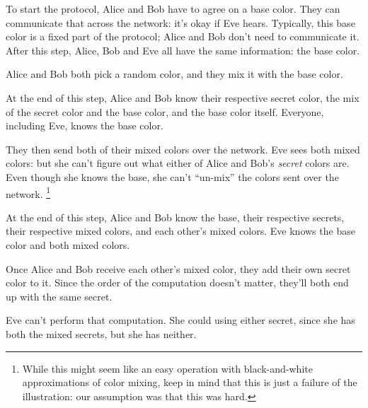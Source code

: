 \documentclass[11pt,ebook,table,dvipsnames]{memoir}
\begin{document}
To start the protocol, Alice and Bob have to agree on a base color.
They can communicate that across the network: it's okay if Eve hears.
Typically, this base color is a fixed part of the protocol; Alice and
Bob don't need to communicate it. After this step, Alice, Bob and Eve
all have the same information: the base color.


Alice and Bob both pick a random color, and they mix it with the base
color.


At the end of this step, Alice and Bob know their respective secret
color, the mix of the secret color and the base color, and the base
color itself. Everyone, including Eve, knows the base color.


They then send both of their mixed colors over the network. Eve sees
both mixed colors: but she can't figure out what either of Alice and
Bob's \emph{secret} colors are. Even though she knows the base, she can't
\enquote{un-mix} the colors sent over the network. \footnote{While this might seem
like an easy operation with black-and-white approximations of color
mixing, keep in mind that this is just a failure of the illustration:
our assumption was that this was hard.}


At the end of this step, Alice and Bob know the base, their respective
secrets, their respective mixed colors, and each other's mixed colors.
Eve knows the base color and both mixed colors.


Once Alice and Bob receive each other's mixed color, they add their
own secret color to it. Since the order of the computation doesn't
matter, they'll both end up with the same secret.


Eve can't perform that computation. She could using either secret,
since she has both the mixed secrets, but she has neither.
\end{document}
